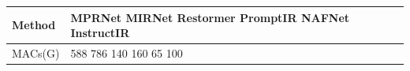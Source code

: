 \begin{tabular}{ll}
\toprule
Method & MPRNet MIRNet Restormer PromptIR NAFNet InstructIR \\
\midrule
MACs(G) & 588 786 140 160 65 100 \\
\bottomrule
\end{tabular}
